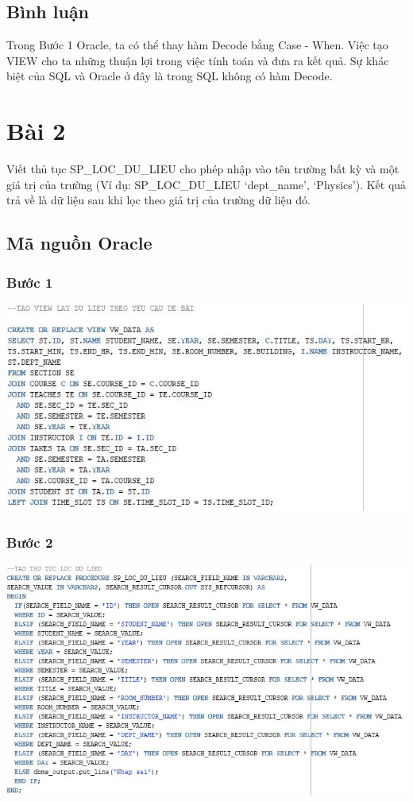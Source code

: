 \documentclass[12pt,a4paper]{report}
\begin{document}
\subsection{Bình luận}
Trong Bước 1 Oracle, ta có thể thay hàm Decode bằng Case - When. Việc tạo VIEW cho ta những thuận lợi trong việc tính toán và đưa ra kết quả. Sự khác biệt của SQL và Oracle ở đây là trong SQL không có hàm Decode.

\section{Bài 2}
\begin{boxedminipage}[t]{15.5cm}
Viết thủ tục SP\_LOC\_DU\_LIEU cho phép nhập vào tên trường bất kỳ và một giá trị của trường (Ví dụ: SP\_LOC\_DU\_LIEU ‘dept\_name’, ‘Physics’). Kết quả trả về là dữ liệu sau khi lọc theo giá trị của trường dữ liệu đó. 	
\end{boxedminipage}

\subsection{Mã nguồn Oracle}
\subsubsection{Bước 1}
\includegraphics[scale=.85]{b2o1.jpg}
\subsubsection{Bước 2}
\includegraphics[scale=.85]{b2o2.jpg}
\end{document}
